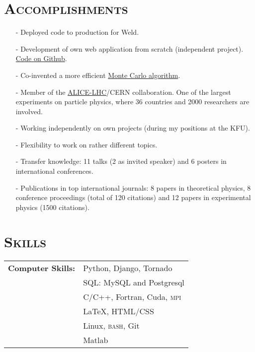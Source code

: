 \documentclass[a4paper, 10pt]{article}
\begin{document}
\section{\textsc{Accomplishments}}
\vspace*{1mm}
\begin{itemize}
    \item[-] Deployed code to production for Weld.
    \item[-] Development of own web application from scratch (independent project).  \href{https://github.com/ydelgadom/non_physics}{Code on Github}.\vspace{-1mm}
    \item[-] Co-invented a more efficient \href{http://inspirehep.net/record/1202877}{Monte Carlo algorithm}.
    \vspace{-1mm}
    \item[-] Member of the \href{http://home.web.cern.ch/about/experiments/alice}{ALICE-LHC}/CERN
    collaboration.  One of the largest experiments on particle physics, where 36 countries and 2000 researchers
    are involved.
    \vspace*{-1mm}
    \item[-] Working independently on own projects (during my positions at the KFU).
    \vspace*{-1mm}
    \item[-] Flexibility to work on rather different topics.
     \vspace*{-1mm}
    \item[-] Transfer knowledge: 11 talks (2 as invited speaker) 
    and 6 posters in international conferences.
     \vspace*{-1mm}
    \item[-] Publications in top international journals:
    8 papers in theoretical physics, 8 conference proceedings (total of 120 citations) and 
    12 papers in experimental physics (1500 citations).
\end{itemize}


\newpage
\section{\textsc{Skills}}
\vspace*{1mm}
\hspace*{-0.7cm}\begin{tabular}{ll}
{\bf Computer Skills:}
      & Python, Django, Tornado\vspace*{1mm}\\ 
      & SQL:  MySQL and Postgresql\vspace*{1mm}\\ 
      & C/C++, Fortran, Cuda, \textsc{mpi}\vspace*{1mm}\\
      & {\LaTeX}, HTML/CSS\vspace*{1mm}\\
      & Linux, \textsc{bash}, Git\vspace*{1mm}\\
      & Matlab\\
\end{tabular}\\[0.5pt]
\end{document}
